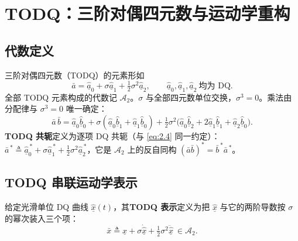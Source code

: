 \section{TODQ：三阶对偶四元数与运动学重构}

\subsection{代数定义}

\begin{definition}\label{def:todq}
三阶对偶四元数（TODQ）的元素形如
\begin{equation}
\bar a=\hat{\underline a}_0+\sigma\hat{\underline a}_1+\tfrac12\sigma^2\hat{\underline a}_2,\qquad \hat{\underline a}_0,\hat{\underline a}_1,\hat{\underline a}_2\ \text{均为 DQ}.
\tag{3.1}\label{eq:3.1}
\end{equation}
全部 TODQ 元素构成的代数记 $\mathcal A_2$。$\sigma$ 与全部四元数单位交换，$\sigma^3=0$。乘法由分配律与 $\sigma^3=0$ 唯一确定：
\begin{equation}
\bar a\,\bar b=\hat{\underline a}_0\hat{\underline b}_0+\sigma(\hat{\underline a}_0\hat{\underline b}_1+\hat{\underline a}_1\hat{\underline b}_0)+\tfrac12\sigma^2\bigl(\hat{\underline a}_0\hat{\underline b}_2+2\hat{\underline a}_1\hat{\underline b}_1+\hat{\underline a}_2\hat{\underline b}_0\bigr).
\tag{3.2}\label{eq:3.2}
\end{equation}
\textbf{TODQ 共轭}定义为逐项 DQ 共轭（与 \eqref{eq:2.4} 同一约定）：$\bar a^{\,*}\triangleq\hat{\underline a}_0^{\,*}+\sigma\hat{\underline a}_1^{\,*}+\tfrac12\sigma^2\hat{\underline a}_2^{\,*}$，它是 $\mathcal A_2$ 上的反自同构 $(\bar a\bar b)^*=\bar b^{\,*}\bar a^{\,*}$。
\end{definition}

\subsection{TODQ 串联运动学表示}

给定光滑单位 DQ 曲线 $\hat{\underline x}(t)$，其\textbf{TODQ 表示}定义为把 $\hat{\underline x}$ 与它的两阶导数按 $\sigma$ 的幂次装入三个项：
\begin{equation}
\bar x\triangleq\hat{\underline x}+\sigma\dot{\hat{\underline x}}+\tfrac12\sigma^2\ddot{\hat{\underline x}}\ \in\mathcal A_2 .
\tag{3.3a}\label{eq:3.3a}
\end{equation}

